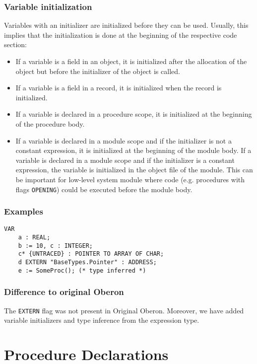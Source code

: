 \documentclass[a4wide,11pt]{article}
\begin{document}
\subsubsection{Variable initialization}
Variables with an initializer are initialized before they can be used.
Usually, this implies that the initialization is done at the beginning of the respective code section:
\begin{itemize}
\item If a variable is a field in an object, it is initialized after the allocation of the object but before the initializer of the object is called.
\item If a variable is a field in a record, it is initialized when the record is initialized.
\item If a variable is declared in a procedure scope, it is initialized at the beginning of the procedure body. 
\item If a variable is declared in a module scope and if the initializer is not a constant expression, it is initialized at the beginning of the module body. 
If a variable is declared in a module scope and if the initializer is a constant expression, the variable is initialized in the object file of the module.
This can be important for low-level system module where code (e.g. procedures with flags \lstinline"OPENING") could be executed before the module body. 
\end{itemize}

\begin{annotation}
\subsubsection{Examples}
\begin{lstlisting}[style=example]
VAR
	a : REAL;
	b := 10, c : INTEGER;
	c* {UNTRACED} : POINTER TO ARRAY OF CHAR;
	d EXTERN "BaseTypes.Pointer" : ADDRESS;
	e := SomeProc(); (* type inferred *)
\end{lstlisting}



\subsubsection{Difference to original Oberon}
The \lstinline"EXTERN" flag was not present in Original Oberon. Moreover, we have added variable initializers and type inference from the expression type.
\end{annotation}

\section{Procedure Declarations}
\end{document}
